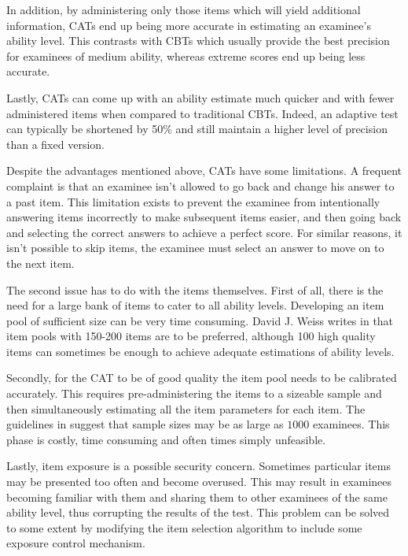 In addition, by administering only those items which will yield additional information, CATs end up being more accurate in estimating an examinee's ability level. This contrasts with CBTs which usually provide the best precision for examinees of medium ability, whereas extreme scores end up being less accurate.\newline

Lastly, CATs can come up with an ability estimate much quicker and with fewer administered items when compared to traditional CBTs. Indeed, an adaptive test can typically be shortened by 50\% and still maintain a higher level of precision than a fixed version.\cite{Weiss1984}
\newline

Despite the advantages mentioned above, CATs have some limitations. A frequent complaint is that an examinee isn't allowed to go back and change his answer to a past item. This limitation exists to prevent the examinee from intentionally answering items incorrectly to make subsequent items easier, and then going back and selecting the correct answers to achieve a perfect score. For similar reasons, it isn't possible to skip items, the examinee must select an answer to move on to the next item.\newline

The second issue has to do with the items themselves. First of all, there is the need for a large bank of items to cater to all ability levels. Developing an item pool of sufficient size can be very time consuming. David J. Weiss writes in \cite{Weiss1985} that item pools with 150-200 items are to be preferred, although 100 high quality items can sometimes be enough to achieve adequate estimations of ability levels. \newline

Secondly, for the CAT to be of good quality the item pool needs to be calibrated accurately. This requires pre-administering the items to a sizeable sample and then simultaneously estimating all the item parameters for each item. The guidelines in \cite{CAT-Primer} suggest that sample sizes may be as large as $1000$ examinees. This phase is costly, time consuming and often times simply unfeasible.\newline

Lastly, item exposure is a possible security concern. Sometimes particular items may be presented too often and become overused. This may result in examinees becoming familiar with them and sharing them to other examinees of the same ability level, thus corrupting the results of the test. This problem can be solved to some extent by modifying the item selection algorithm to include some exposure control mechanism.\newline

